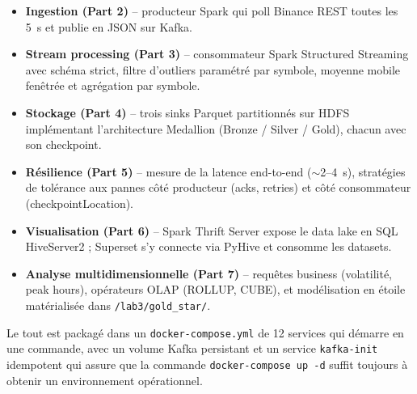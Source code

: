 \documentclass{RapportINPTCLOUD}
\begin{document}
\begin{itemize}[leftmargin=2em]
    \item \textbf{Ingestion (Part 2)} -- producteur Spark qui poll Binance REST toutes les 5~s et publie en JSON sur Kafka.
    \item \textbf{Stream processing (Part 3)} -- consommateur Spark Structured Streaming avec sch\'{e}ma strict, filtre d'outliers param\'{e}tr\'{e} par symbole, moyenne mobile fen\^{e}tr\'{e}e et agr\'{e}gation par symbole.
    \item \textbf{Stockage (Part 4)} -- trois sinks Parquet partitionn\'{e}s sur HDFS impl\'{e}mentant l'architecture Medallion (Bronze / Silver / Gold), chacun avec son checkpoint.
    \item \textbf{R\'{e}silience (Part 5)} -- mesure de la latence end-to-end ($\sim$2--4~s), strat\'{e}gies de tol\'{e}rance aux pannes c\^{o}t\'{e} producteur (acks, retries) et c\^{o}t\'{e} consommateur (checkpointLocation).
    \item \textbf{Visualisation (Part 6)} -- Spark Thrift Server expose le data lake en SQL HiveServer2 ; Superset s'y connecte via PyHive et consomme les datasets.
    \item \textbf{Analyse multidimensionnelle (Part 7)} -- requ\^{e}tes business (volatilit\'{e}, peak hours), op\'{e}rateurs OLAP (ROLLUP, CUBE), et mod\'{e}lisation en \'{e}toile mat\'{e}rialis\'{e}e dans \texttt{/lab3/gold\_star/}.
\end{itemize}

Le tout est packag\'{e} dans un \texttt{docker-compose.yml} de 12 services qui d\'{e}marre en une commande, avec un volume Kafka persistant et un service \texttt{kafka-init} idempotent qui assure que la commande \texttt{docker-compose up -d} suffit toujours \`{a} obtenir un environnement op\'{e}rationnel.
\end{document}
